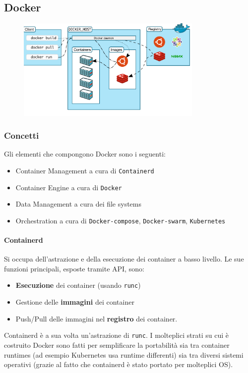 \documentclass{article}
\begin{document}
		\newpage
		\subsection{Docker}
		\begin{figure}[ht]
		    \centering
		    \includegraphics[width=0.8\textwidth]{SAC_B2_DockerStructure.png}
		\end{figure}
		
		\subsubsection{Concetti}
		Gli elementi che compongono Docker sono i seguenti:
		\begin{itemize}
			\item Container Management a cura di \verb*|Containerd|
			\item Container Engine a cura di \verb*|Docker|
			\item Data Management a cura dei file systems
			\item Orchestration a cura di \verb*|Docker-compose|, \verb*|Docker-swarm|, \verb*|Kubernetes|
		\end{itemize}
		
		\paragraph{Containerd}
		Si occupa dell'astrazione e della esecuzione dei container a basso livello. Le sue funzioni principali, esposte tramite API, sono:
		\begin{itemize}
			\item \textbf{Esecuzione} dei container (usando \verb|runc|)
			\item Gestione delle \textbf{immagini} dei container
			\item Push/Pull delle immagini nel \textbf{registro} dei container.
		\end{itemize}
		Containerd è a sua volta un'astrazione di \verb*|runc|. I molteplici strati su cui è costruito Docker sono fatti per semplificare la portabilità sia tra container runtimes (ad esempio Kubernetes usa runtime differenti) sia tra diversi sistemi operativi (grazie al fatto che containerd è stato portato per molteplici OS).\\
		
\end{document}
